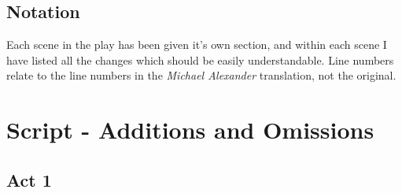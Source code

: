\documentclass[a4paper]{article}
\begin{document}
\subsection{Notation}%

Each scene in the play has been given it's own section, and within each scene I 
have listed all the changes which should be easily understandable. Line
numbers relate to the line numbers in the \textit{Michael Alexander} translation, not
the original.

\newpage

\section{Script - Additions and Omissions}

\subsection{Act 1}%
\end{document}
